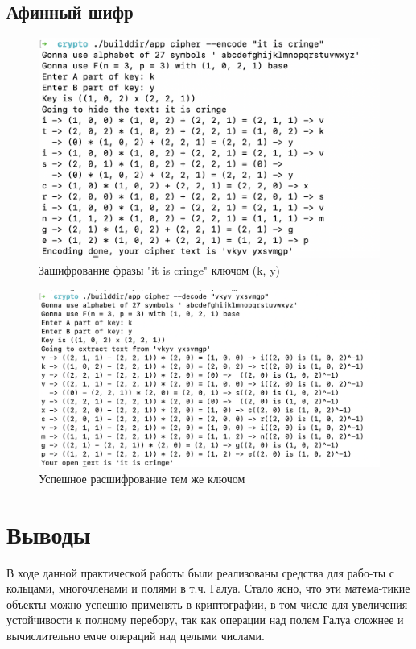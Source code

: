 \documentclass[a4paper]{article}
\begin{document}
\subsection{Афинный шифр}

\begin{figure}[H]
  \centering
  \includegraphics[width=\textwidth]{14_8}
  \caption{Зашифрование фразы "it is cringe" ключом (k, y)}
\end{figure}

\begin{figure}[H]
  \centering
  \includegraphics[width=\textwidth]{14_9}
  \caption{Успешное расшифрование тем же ключом}
\end{figure}

\newpage
\section{Выводы}

В ходе данной практической работы были реализованы средства для
рабо-ты с кольцами, многочленами и полями в т.ч. Галуа. Стало ясно,
что эти матема-тикие объекты можно успешно применять в криптографии, в том
числе для увеличения устойчивости к полному перебору, так как операции над
полем Галуа сложнее и вычислительно емче операций над целыми числами.
\end{document}
